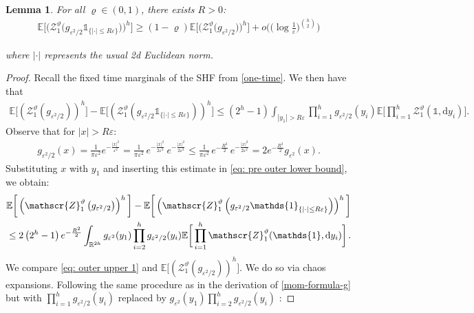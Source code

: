 \documentclass[10pt,a4paper]{amsart}
\newtheorem{lemma}{Lemma}
\newcommand{\bbE}{{\ensuremath{\mathbb E}} }
\newcommand{\bbR}{{\ensuremath{\mathbb R}} }
\newcommand\dd{\mathrm{d}}
\renewcommand{\epsilon}{\varepsilon}
\newcommand{\f}{\frac}
\newcommand{\gt}{\vartheta}
\newcommand{\ind}{\mathds{1}}
\newcommand\qa{\bigg[}
\newcommand\qb{\bigg]}
\newcommand\ra{\left(}
\newcommand\rb{\right)}
\renewcommand{\rho}{\varrho}
\begin{document}
\begin{lemma}\label{thm: outer lower bound}
    For all $\rho\in (0,1)$, there exists $R>0$:
        \begin{align}\label{eq: outer lower bound}
        \bbE  \Big[ \Big( \mathscr{Z}^\gt_1 \big( g_{\epsilon^2/2} \ind_{ \{ |\cdot| \le R \epsilon \} } \big) \Big)^h \Big] 
        \ge (1-\rho) \bbE   \Big[ \Big(\mathscr{Z}^\gt_1 \big( g_{ \epsilon^2/2 } \big) \Big)^h\Big]  +   
        o\Big( \big(\log\f{1}{\epsilon} \big)^{h\choose 2} \Big)
    \end{align}

    where $|\cdot|$ represents the usual 2d Euclidean norm.
\end{lemma}

\begin{proof}
    Recall the fixed time marginals of the SHF from \eqref{one-time}. We then have that
    \begin{align}\label{eq: pre outer lower bound}
    \bbE  \qa \ra \mathscr{Z}^\gt_1 \ra g_{\epsilon^2/2} \rb \rb^h \qb
        -\bbE  \qa \ra \mathscr{Z}^\gt_1 \ra g_{\epsilon^2/2} \ind_{ \{ |\cdot| \le R \epsilon \} } \rb \rb^h \qb 
    \le \ra 2^h-1 \rb  \int_{|y_1|>R\epsilon} \prod_{i=1}^h g_{\epsilon^2/2}(y_i) \bbE \qa \prod_{i=1}^h \mathscr{Z}_1^\gt(\ind, \dd y_i)  \qb.
    \end{align}
    Observe that for $|x|>R\epsilon$:
    \begin{align*}
        g_{\epsilon^2/2}(x) 
        = \f{1}{\pi \epsilon^2} e^{-\f{|x|^2}{\epsilon^2} }
        = \f{1}{\pi \epsilon^2} \, e^{-\f{|x|^2}{2\epsilon^2} } \, e^{-\f{|x|^2}{2\epsilon^2} }
        \le \f{1}{\pi \epsilon^2} \, e^{-\f{R^2}{2} } \, e^{-\f{|x|^2}{2\epsilon^2} }
        = 2 e^{-\f{R^2}{2} } g_{\epsilon^2} (x).
    \end{align*}
    Substituting $x$ with $y_1$ and inserting this estimate in \eqref{eq: pre outer lower bound}, we obtain:
    \begin{align}\label{eq: outer upper 1}
        & \bbE  \qa \ra \mathscr{Z}^\gt_1 \ra g_{\epsilon^2/2} \rb \rb^h \qb
        -\bbE  \qa \ra \mathscr{Z}^\gt_1 \ra g_{\epsilon^2/2} \ind_{ \{ |\cdot| \le R \epsilon \} } \rb \rb^h \qb  \notag\\
        & \le 2 \ra 2^h-1 \rb e^{-\f{R^2}{2} } \int_{\bbR^{2h}} g_{\epsilon^2}(y_1) \prod_{i=2}^h g_{\epsilon^2/2}(y_i) \bbE \qa \prod_{i=1}^h \mathscr{Z}_1^\gt(\ind, \dd y_i)  \qb  \,.
    \end{align}
    We compare \eqref{eq: outer upper 1} and $\bbE  \qa \ra \mathscr{Z}^\gt_1 \ra g_{\epsilon^2/2} \rb \rb^h \qb$. We do so via chaos expansions.  Following the same procedure as in the derivation of \eqref{mom-formula-g} but with $\prod_{i=1}^h g_{\epsilon^2/2}(y_i)$ replaced by $g_{\epsilon^2}(y_1) \prod_{i=2}^h g_{\epsilon^2/2}(y_i)$  :

\end{proof}
\end{document}
